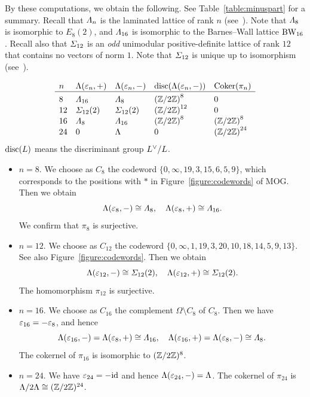 \documentclass{amsart} %
\begin{document}
By these computations,
 we obtain the following.
 See Table~\ref{table:minuspart} for a summary.
 Recall that $\varLambda_{n}$ is 
 the laminated lattice of rank $n$
(see~\cite[Figure 6.2]{theCSbook}).
 Note that $\varLambda_8$
is isomorphic to $E_8(2)$,
and $\varLambda_{16}$ is 
isomorphic to the Barnes--Wall lattice $\mathrm{BW}_{16}$.
 Recall also that
$\varSigma_{12}$ is an \emph{odd} unimodular positive-definite lattice of rank $12$
that contains no vectors of norm $1$.
Note that $\varSigma_{12}$ is unique up to isomorphism
(see~\cite[Table 16.7]{theCSbook}).
%
\begin{table}
\[
\begin{array}{lllll}
n & \Leech(\vep_n, +)& \Leech(\vep_n, -) & \disc(\Leech(\vep_n, -)) & \Coker (\pi_n) \\
\hline
8 & \Lamsxtn & \Laminated_{8} & {(\ZZ/2\ZZ)}^{8\;\;} & 0 \mystruth{12pt}\\
12 & \Sigmatwlv(2) & \Sigmatwlv(2) & {(\ZZ/2\ZZ)}^{12} & 0 \\
16 & \Laminated_{8} & \Lamsxtn & {(\ZZ/2\ZZ)}^{8\;\;} &{(\ZZ/2\ZZ)}^{8\;\;} \\
24& 0 & \Leech &0 &{(\ZZ/2\ZZ)}^{24} \\
\end{array}
\]
{\small 
$\operatorname{disc} (L)$ means the discriminant group $L^{\vee}/L$.\phantom{aaaa}}
\smallskip
\caption{$\Leech(\vep_n, +)$ and $\Leech(\vep_n, -)$}\label{table:minuspart}
\end{table}
%
\begin{itemize}
%
\item $n=8$. 
We choose as $C_{8}$ the codeword 
$\{ 0,\infty, 19, 3, 15, 6, 5, 9\} $, 
which corresponds to 
the positions with $*$ in Figure~\ref{figure:codewords} of MOG.
Then we obtain 
\[
\Lambda(\varepsilon_8, -)\cong \varLambda_{8},
\quad 
\Lambda(\varepsilon_8, +)\cong \varLambda_{16}.
\]
We confirm  that 
 $\pi_{8}$ is surjective.
%
\item $n=12$. 
We choose as $C_{12}$ the codeword 
$\{ 0,\infty, 1,19, 3, 20,10, 18, 14, 5, 9, 13\}$.
See also Figure~\ref{figure:codewords}.
Then we obtain 
\[
\Lambda(\varepsilon_{12}, -)\cong \varSigma_{12}(2),
\quad 
\Lambda(\varepsilon_{12}, +)\cong \varSigma_{12}(2).
\]
The homomorphism $\pi_{12}$ is surjective.
%
\item $n=16$. 
We choose as $C_{16}$ the complement $\Omega\setminus C_8$ of $C_8$. 
Then we have $\varepsilon_{16}=-\varepsilon_{8}$, and hence 
\[
\Lambda(\varepsilon_{16}, -)=\Lambda(\varepsilon_{8}, +)\cong \varLambda_{16},
\quad 
\Lambda(\varepsilon_{16}, +)=\Lambda(\varepsilon_8, -)\cong \varLambda_{8}.
\]
%
The cokernel of $\pi_{16}$ is isomorphic to $(\mathord{\mathbb{Z}}/2\mathord{\mathbb{Z}})^8$.
%
\item $n=24$. We have $\varepsilon_{24}=-\mathord{\mathrm{id}}$ and hence 
$\Lambda(\varepsilon_{24}, -)=\Lambda$.
The cokernel of $\pi_{24}$ is $\Lambda/2\Lambda \cong (\mathord{\mathbb{Z}}/2\mathord{\mathbb{Z}})^{24}$.
\end{itemize}
\end{document}

